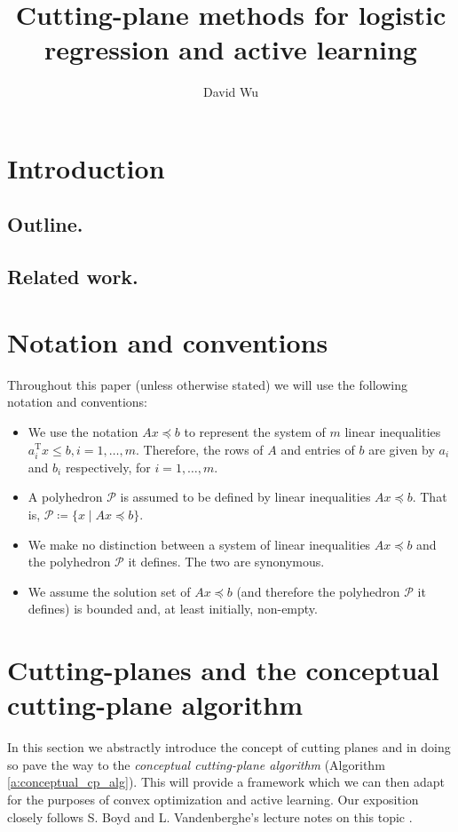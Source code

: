 \documentclass[11pt]{amsart}
\theoremstyle{definition}
\theoremstyle{remark}
\newcommand{\transpose}{\text{T}}
\begin{document}
\lstset{language=}
\pagestyle{plain}

\title{Cutting-plane methods for logistic regression and active learning}
\author{David Wu}

\maketitle


\section{Introduction}

    \subsection{Outline.}

    \subsection{Related work.}


\section{Notation and conventions}
    Throughout this paper (unless otherwise stated) we will use the following notation and conventions: 
    \begin{itemize}
        \item We use the notation $Ax \preceq b$ to represent the system of $m$ linear inequalities $a_i^\transpose x \leq b, i = 1, \dots, m$. Therefore, the rows of $A$ and entries of $b$ are given by $a_i$ and $b_i$ respectively, for $i = 1, \dots, m$.
        \item A polyhedron $\mathcal{P}$ is assumed to be defined by linear inequalities $Ax \preceq b$. That is, $\mathcal{P} \coloneqq \{x \;|\; Ax \preceq b\}$.
        \item We make no distinction between a system of linear inequalities $Ax \preceq b$ and the polyhedron $\mathcal{P}$ it defines. The two are synonymous. 
        \item We assume the solution set of $Ax \preceq b$ (and therefore the polyhedron $\mathcal{P}$ it defines) is bounded and, at least initially, non-empty. 
    \end{itemize}  

\section{Cutting-planes and the conceptual cutting-plane algorithm}
    In this section we abstractly introduce the concept of cutting planes and in doing so pave the way to the \emph{conceptual cutting-plane algorithm} (Algorithm \ref{a:conceptual_cp_alg}). This will provide a framework which we can then adapt for the purposes of convex optimization and active learning. Our exposition closely follows S. Boyd and L. Vandenberghe's lecture notes on this topic \cite[Sections 1-3]{BV11}. 
\end{document}
